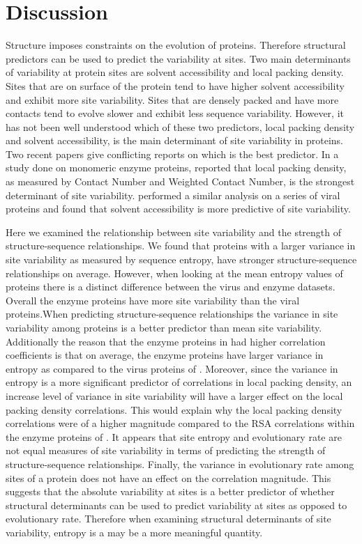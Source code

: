 \documentclass[12pt]{article}
\begin{document}
\section{Discussion}
\label{sec:dcr}
Structure imposes constraints on the evolution of proteins. Therefore structural predictors can be used to predict the variability at sites. Two main determinants of variability at protein sites are solvent accessibility and local packing density. Sites that are on surface of the protein tend to have higher solvent accessibility and exhibit more site variability. Sites that are densely packed and have more contacts tend to evolve slower and exhibit less sequence variability. However, it has not been well understood which of these two predictors, local packing density and solvent accessibility, is the main determinant of site variability in proteins. Two recent papers \citep{Shahmoradietal2014, Yehetal2014} give conflicting reports on which is the best predictor. In a study done on monomeric enzyme proteins, \cite{Yehetal2014} reported that local packing density, as measured by Contact Number and Weighted Contact Number, is the strongest determinant of site variability. \cite{Shahmoradietal2014} performed a similar analysis on a series of viral proteins and found that solvent accessibility is more predictive of site variability. 

\indent Here we examined the relationship between site variability and the strength of structure-sequence relationships. We found that proteins with a larger variance in site variability as measured by sequence entropy, have stronger structure-sequence relationships on average. However, when looking at the mean entropy values of proteins there is a distinct difference between the virus and enzyme datasets. Overall the enzyme proteins have more site variability than the viral proteins.When predicting structure-sequence relationships the variance in site variability among proteins is a better predictor than mean site variability.  Additionally the reason that the enzyme proteins in \cite{Yehetal2014} had higher correlation coefficients is that on average, the enzyme proteins have larger variance in entropy as compared to the virus proteins of \cite{Shahmoradietal2014}. Moreover, since the variance in entropy is a more significant predictor of correlations in local packing density, an increase level of variance in site variability will have a larger effect on the local packing density correlations. This would explain why the local packing density correlations were of a higher magnitude compared to the RSA correlations within the enzyme proteins of \cite{Yehetal2014}. It appears that site entropy and evolutionary rate are not equal measures of site variability in terms of predicting the strength of structure-sequence relationships. Finally, the variance in evolutionary rate among sites of a protein does not have an effect on the correlation magnitude. This suggests that the absolute variability at sites is a better predictor of whether structural determinants can be used to predict variability at sites  as opposed to evolutionary rate. Therefore when examining structural determinants of site variability, entropy is a may be a more meaningful quantity. 
\end{document}
